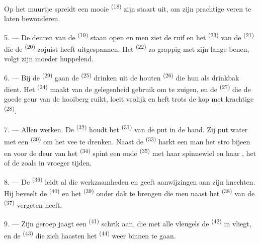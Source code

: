 Op het muurtje spreidt een mooie  \textsuperscript{(18)} zijn staart uit, om zijn
prachtige veren te laten bewonderen.

\VUsaut{3.0mm}

5. --- De deuren van de  \textsuperscript{(19)} staan open en men ziet de
ruif en het  \textsuperscript{(23)} van de
 \textsuperscript{(21)} die de 
\textsuperscript{(20)} zojuist heeft uitgespannen. Het  \textsuperscript{(22)}
zo grappig met zijn lange benen, volgt zijn moeder huppelend.

6. --- Bij de  \textsuperscript{(29)} gaan de 
\textsuperscript{(25)} drinken uit de houten  \textsuperscript{(26)} die hun als
drinkbak dient. Het  \textsuperscript{(24)} maakt van de gelegenheid gebruik om
te zuigen, en de
 \textsuperscript{(27)} die de goede geur van de hooiberg ruikt,
loeit vrolijk en heft trots de kop met krachtige  \textsuperscript{(28)}.

7. --- Allen werken. De  \textsuperscript{(32)} houdt het
 \textsuperscript{(31)} van de put in de hand. Zij put water met
een  \textsuperscript{(30)} om het vee te drenken. Naast de
 \textsuperscript{(33)} harkt een man het stro bijeen en voor de
deur van het  \textsuperscript{(34)} spint een oude
 \textsuperscript{(35)} met haar spinnewiel en haar
, het  of de  zoals in vroeger
tijden.

\VUsaut{3.0mm}
\VUsaut{3.0mm}

8. --- De  \textsuperscript{(36)} leidt al die werkzaamheden en geeft
aanwijzingen aan zijn knechten. Hij beveelt de  \textsuperscript{(40)} en het
 \textsuperscript{(39)} onder dak te brengen die men naast het 
\textsuperscript{(38)} van de
 \textsuperscript{(37)} vergeten heeft.

9. --- Zijn geroep jaagt een  \textsuperscript{(41)} schrik aan, die met alle
vleugels de  \textsuperscript{(42)} in vliegt, en de 
\textsuperscript{(43)} die zich haasten het  \textsuperscript{(44)} weer
binnen te gaan.

